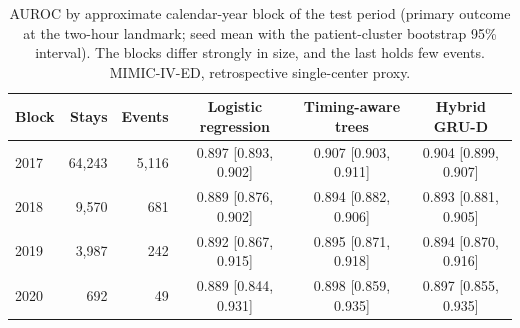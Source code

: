 \begin{table}[t]
\centering
\caption{AUROC by approximate calendar-year block of the test period (primary outcome at the two-hour landmark; seed mean with the patient-cluster bootstrap 95\% interval). The blocks differ strongly in size, and the last holds few events. MIMIC-IV-ED, retrospective single-center proxy.}
\label{tab:years}
\begin{tabular}{lrrccc}
\toprule
Block & Stays & Events & Logistic regression & Timing-aware trees & Hybrid GRU-D \\
\midrule
2017 & 64,243 & 5,116 & 0.897 [0.893, 0.902] & 0.907 [0.903, 0.911] & 0.904 [0.899, 0.907] \\
2018 & 9,570 & 681 & 0.889 [0.876, 0.902] & 0.894 [0.882, 0.906] & 0.893 [0.881, 0.905] \\
2019 & 3,987 & 242 & 0.892 [0.867, 0.915] & 0.895 [0.871, 0.918] & 0.894 [0.870, 0.916] \\
2020 & 692 & 49 & 0.889 [0.844, 0.931] & 0.898 [0.859, 0.935] & 0.897 [0.855, 0.935] \\
\bottomrule
\end{tabular}
\end{table}
